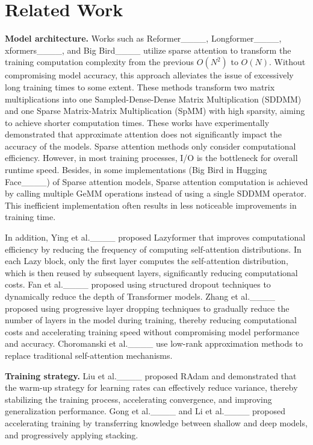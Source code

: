 \section{Related Work}
\label{sec6}

\textbf{Model architecture.} Works such as Reformer____, Longformer____, xformers____, and Big Bird____ utilize sparse attention to transform the training computation complexity from the previous $O(N^2)$ to $O(N)$. 
Without compromising model accuracy, this approach alleviates the issue of excessively long training times to some extent.  
These methods transform two matrix multiplications into one Sampled-Dense-Dense Matrix Multiplication (SDDMM) and one Sparse Matrix-Matrix Multiplication (SpMM) with high sparsity, aiming to achieve shorter computation times. 
These works have experimentally demonstrated that approximate attention does not significantly impact the accuracy of the models.
Sparse attention methods only consider computational efficiency. 
However, in most training processes, I/O is the bottleneck for overall runtime speed. 
Besides, in some implementations (Big Bird in Hugging Face____) of Sparse attention models, Sparse attention computation is achieved by calling multiple GeMM operations instead of using a single SDDMM operator. 
This inefficient implementation often results in less noticeable improvements in training time.

In addition, Ying et al.____ proposed Lazyformer that improves computational efficiency by reducing the frequency of computing self-attention distributions. 
In each Lazy block, only the first layer computes the self-attention distribution, which is then reused by subsequent layers, significantly reducing computational costs. 
Fan et al.____ proposed using structured dropout techniques to dynamically reduce the depth of Transformer models. 
Zhang et al.____ proposed using progressive layer dropping techniques to gradually reduce the number of layers in the model during training, thereby reducing computational costs and accelerating training speed without compromising model performance and accuracy. 
Choromanski et al.____ use low-rank approximation methods to replace traditional self-attention mechanisms.

\noindent\textbf{Training strategy.} Liu et al.____ proposed RAdam and demonstrated that the warm-up strategy for learning rates can effectively reduce variance, thereby stabilizing the training process, accelerating convergence, and improving generalization performance. 
Gong et al.____ and Li et al.____ proposed accelerating training by transferring knowledge between shallow and deep models, and progressively applying stacking.

